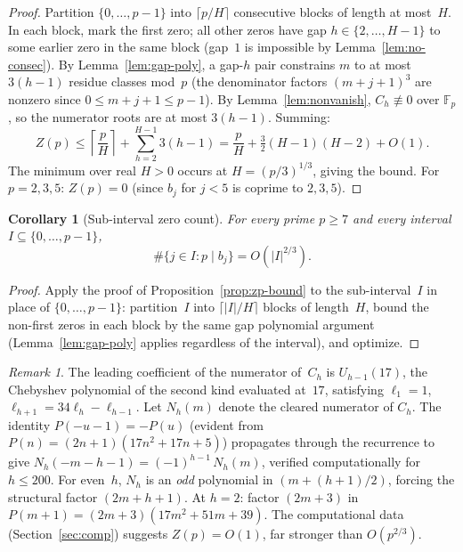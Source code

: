 \documentclass[11pt]{article}
\newtheorem{corollary}[theorem]{Corollary}
\theoremstyle{definition}
\theoremstyle{remark}
\newtheorem{remark}[theorem]{Remark}
\begin{document}
\begin{proof}
Partition $\{0,\ldots,p-1\}$ into $\lceil p/H \rceil$
consecutive blocks of length at most~$H$.
In each block, mark the first zero; all other zeros
have gap $h \in \{2, \ldots, H - 1\}$ to some earlier
zero in the same block (gap~$1$ is impossible by
Lemma~\ref{lem:no-consec}).
By Lemma~\ref{lem:gap-poly}, a gap-$h$ pair constrains
$m$ to at most $3(h - 1)$ residue classes mod~$p$
(the denominator factors $(m+j+1)^3$ are nonzero
since $0 \le m+j+1 \le p - 1$).
By Lemma~\ref{lem:nonvanish}, $C_h \not\equiv 0$ over
$\mathbb{F}_p$, so the numerator roots are at most
$3(h-1)$.  Summing:
\[
Z(p) \le \left\lceil\frac{p}{H}\right\rceil
+ \sum_{h=2}^{H-1} 3(h - 1)
= \frac{p}{H} + \tfrac{3}{2}(H-1)(H-2) + O(1).
\]
The minimum over real $H > 0$ occurs at
$H = (p/3)^{1/3}$, giving the bound.
For $p = 2, 3, 5$: $Z(p) = 0$ (since $b_j$ for
$j < 5$ is coprime to $2, 3, 5$).
\end{proof}

\begin{corollary}[Sub-interval zero count]\label{cor:subinterval}
For every prime $p \ge 7$ and every interval
$I \subseteq \{0, \ldots, p{-}1\}$,
\[
\#\{j \in I : p \mid b_j\} = O(|I|^{2/3}).
\]
\end{corollary}
\begin{proof}
Apply the proof of Proposition~\ref{prop:zp-bound} to
the sub-interval~$I$ in place of $\{0,\ldots,p{-}1\}$:
partition~$I$ into $\lceil|I|/H\rceil$ blocks of length~$H$,
bound the non-first zeros in each block by the same gap
polynomial argument (Lemma~\ref{lem:gap-poly} applies
regardless of the interval), and optimize.
\end{proof}

\begin{remark}\label{rem:effective}
The leading coefficient of the numerator of~$C_h$
is $U_{h-1}(17)$, the Chebyshev polynomial of the second kind
evaluated at~$17$, satisfying $\ell_1 = 1$,
$\ell_{h+1} = 34\ell_h - \ell_{h-1}$.
Let $N_h(m)$ denote the cleared numerator of $C_h$.
The identity $P(-u-1) = -P(u)$ (evident from $P(n) =
(2n+1)(17n^2+17n+5)$) propagates through the recurrence to give
$N_h(-m-h-1) = (-1)^{h-1}\,N_h(m)$,
verified computationally for $h \le 200$.
For even~$h$, $N_h$ is an \emph{odd} polynomial in
$(m + (h{+}1)/2)$, forcing the structural factor
$(2m+h+1)$.  At $h = 2$: factor $(2m+3)$ in
$P(m+1) = (2m+3)(17m^2+51m+39)$.
The computational data (Section~\ref{sec:comp}) suggests
$Z(p) = O(1)$, far stronger than $O(p^{2/3})$.
\end{remark}
\end{document}
